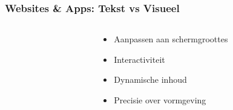 \documentclass[presentatie.tex]{subfiles}
\begin{document}
    \begin{frame}
        \frametitle{Websites \& Apps: Tekst vs Visueel}
        \begin{columns}
            \begin{column}{0.6\textwidth}
                \vspace{10px}
                \unless\ifishandout
                \fi
            \end{column}
            \begin{column}{0.45\textwidth}
                \begin{itemize}
                    \item Aanpassen aan schermgroottes
                    \item Interactiviteit
                    \item Dynamische inhoud
                    \item Precisie over vormgeving
                \end{itemize}


\end{column}
\end{columns}
\end{frame}
\end{document}
